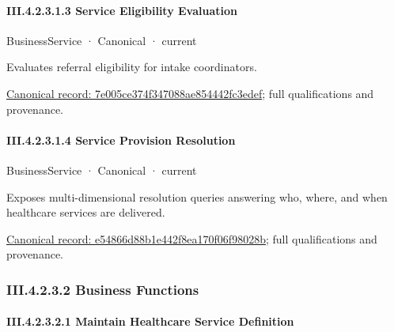 \paragraph*{III.4.2.3.1.3 Service Eligibility Evaluation}
\label{navigation:III.4.2.3.1.3}

\label{element:7e005ce374f347088ae854442fc3edef}
{\small BusinessService · Canonical · current}\par

Evaluates referral eligibility for intake coordinators.


{\footnotesize \href{../../../../continuum/business/business-service/7e005ce374f347088ae854442fc3edef.md}{Canonical record: 7e005ce374f347088ae854442fc3edef}; full qualifications and provenance.}\par
\paragraph*{III.4.2.3.1.4 Service Provision Resolution}
\label{navigation:III.4.2.3.1.4}

\label{element:e54866d88b1e442f8ea170f06f98028b}
{\small BusinessService · Canonical · current}\par

Exposes multi-dimensional resolution queries answering who, where, and when healthcare services are delivered.


{\footnotesize \href{../../../../continuum/business/business-service/e54866d88b1e442f8ea170f06f98028b.md}{Canonical record: e54866d88b1e442f8ea170f06f98028b}; full qualifications and provenance.}\par
\subsubsection*{III.4.2.3.2 Business Functions}
\label{navigation:III.4.2.3.2}

\paragraph*{III.4.2.3.2.1 Maintain Healthcare Service Definition}
\label{navigation:III.4.2.3.2.1}

